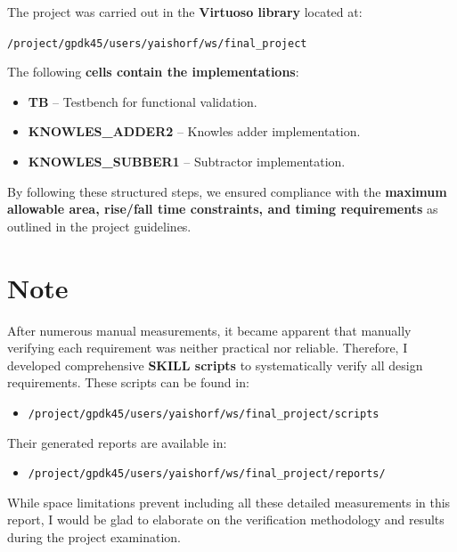 \documentclass[a4paper,12pt]{article}
\begin{document}
The project was carried out in the \textbf{Virtuoso library} located at:  
\begin{center}
    \texttt{/project/gpdk45/users/yaishorf/ws/final\_project}
\end{center}

The following \textbf{cells contain the implementations}:
\begin{itemize}
    \item \textbf{TB} – Testbench for functional validation.
    \item \textbf{KNOWLES\_ADDER2} – Knowles adder implementation.
    \item \textbf{KNOWLES\_SUBBER1} – Subtractor implementation.
\end{itemize}

By following these structured steps, we ensured compliance with the \textbf{maximum allowable area, rise/fall time constraints, and timing requirements} as outlined in the project guidelines.
\section*{Note}
After numerous manual measurements, it became apparent that manually verifying each requirement was neither practical nor reliable. Therefore, I developed comprehensive \textbf{SKILL scripts} to systematically verify all design requirements. These scripts can be found in:

\begin{itemize}
    \item \texttt{/project/gpdk45/users/yaishorf/ws/final\_project/scripts}
\end{itemize}

Their generated reports are available in:

\begin{itemize}
    \item \texttt{/project/gpdk45/users/yaishorf/ws/final\_project/reports/}
\end{itemize}

While space limitations prevent including all these detailed measurements in this report, I would be glad to elaborate on the verification methodology and results during the project examination.
\end{document}
